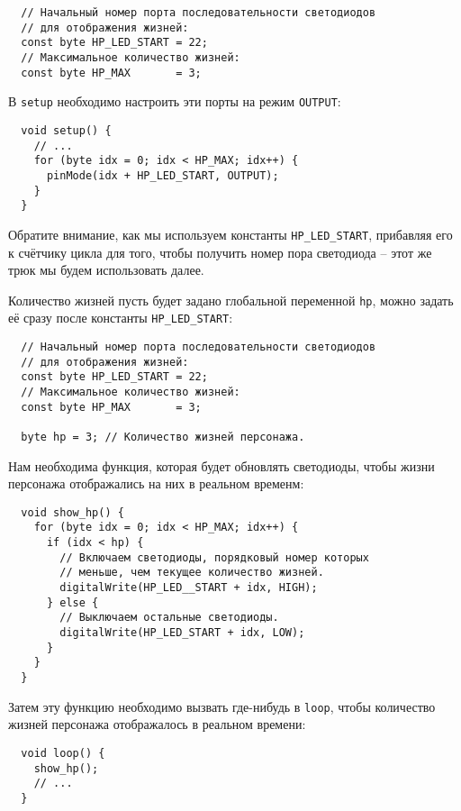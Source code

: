 \documentclass[../sparc.tex]{subfiles}
\begin{document}
\begin{verbatim}
  // Начальный номер порта последовательности светодиодов
  // для отображения жизней:
  const byte HP_LED_START = 22;
  // Максимальное количество жизней:
  const byte HP_MAX       = 3;
\end{verbatim}

В \texttt{setup} необходимо настроить эти порты на режим \texttt{OUTPUT}:

\begin{verbatim}
  void setup() {
    // ...
    for (byte idx = 0; idx < HP_MAX; idx++) {
      pinMode(idx + HP_LED_START, OUTPUT);
    }
  }
\end{verbatim}

Обратите внимание, как мы используем константы \texttt{HP\_LED\_START},
прибавляя его к счётчику цикла для того, чтобы получить номер пора светодиода --
этот же трюк мы будем использовать далее.

Количество жизней пусть будет задано глобальной переменной \texttt{hp}, можно
задать её сразу после константы \texttt{HP\_LED\_START}:

\begin{verbatim}
  // Начальный номер порта последовательности светодиодов
  // для отображения жизней:
  const byte HP_LED_START = 22;
  // Максимальное количество жизней:
  const byte HP_MAX       = 3;

  byte hp = 3; // Количество жизней персонажа.
\end{verbatim}

Нам необходима функция, которая будет обновлять светодиоды, чтобы жизни
персонажа отображались на них в реальном временм:

\begin{verbatim}
  void show_hp() {
    for (byte idx = 0; idx < HP_MAX; idx++) {
      if (idx < hp) {
        // Включаем светодиоды, порядковый номер которых
        // меньше, чем текущее количество жизней.
        digitalWrite(HP_LED__START + idx, HIGH);
      } else {
        // Выключаем остальные светодиоды.
        digitalWrite(HP_LED_START + idx, LOW);
      }
    }
  }
\end{verbatim}

Затем эту функцию необходимо вызвать где-нибудь в \texttt{loop}, чтобы
количество жизней персонажа отображалось в реальном времени:

\begin{verbatim}
  void loop() {
    show_hp();
    // ...
  }
\end{verbatim}
\end{document}
